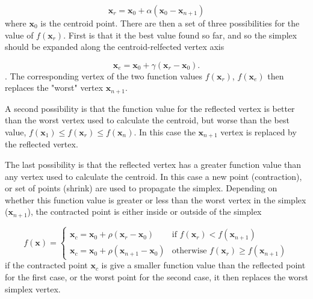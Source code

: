 \begin{equation}
\mathbf{x}_r = \mathbf{x}_0 + \alpha\left(\mathbf{x}_0 - \mathbf{x}_{n+1}\right) 
\end{equation}
%
where $\mathbf{x}_0$ is the centroid point. There are then a set of three possibilities
for the value of $f\left(\mathbf{x}_r\right)$. First is that it the best value
found so far, and so the simplex should be expanded along the centroid-relfected 
vertex axis

\begin{equation}
\mathbf{x}_e = \mathbf{x}_0 + \gamma\left(\mathbf{x}_r - \mathbf{x}_0 \right).
\end{equation}
%
. The corresponding vertex of the two function values $f\left(\mathbf{x}_r\right)$, 
$f\left(\mathbf{x}_e\right)$ then replaces the "worst" vertex $\mathbf{x}_{n+1}$.

A second possibility is that the function value for the reflected vertex is better
than the worst vertex used to calculate the centroid, but worse than the best 
value, $f\left(\mathbf{x}_1\right) \leq f\left(\mathbf{x}_r\right) \leq f\left(\mathbf{x}_n\right)$.
In this case the $\mathbf{x}_{n+1}$ vertex is replaced by the reflected vertex.

The last possibility is that the reflected vertex has a greater function value than
any vertex used to calculate the centroid. In this case a new point (contraction),
or set of points (shrink) are used to propagate the simplex. Depending on whether
this function value is greater or less than the worst vertex in the simplex ($\mathbf{x}_{n+1}$),
the contracted point is either inside or outside of the simplex

\begin{equation}
    f\left(\mathbf{x}\right)= 
    \begin{cases}
    \mathbf{x}_c = \mathbf{x}_0 + \rho \left(\mathbf{x}_r - \mathbf{x}_0 \right)               & \text{if } f\left(\mathbf{x}_r\right) < f\left(\mathbf{x}_{n+1}\right)\\
    \mathbf{x}_c = \mathbf{x}_0 + \rho \left(\mathbf{x}_{n+1} - \mathbf{x}_0 \right)           & \text{otherwise } f\left(\mathbf{x}_r\right) \geq f\left(\mathbf{x}_{n+1}\right)
    \end{cases}
\end{equation}
%
if the contracted point $\mathbf{x}_c$ is give a smaller function value than the 
reflected point for the first case, or the worst point for the second case, it then
replaces the worst simplex vertex.

